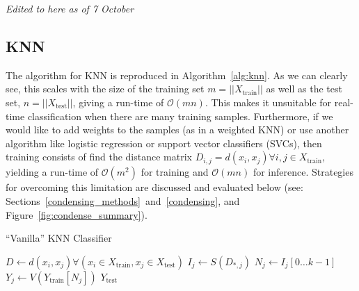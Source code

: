 \documentclass[conference]{IEEEtran}
\newcommand{\cm}[1]{\textit{{\color{blue}#1}}}
\begin{document}
\cm{Edited to here as of 7 October}
\subsection{KNN}
\label{runtime}
The algorithm for KNN is reproduced in Algorithm~\ref{alg:knn}. As we can clearly see, this scales with the size of the training set $m = || X_{\text{train}} || $ as well as the test set, $n = || X_{\text{test}} ||$, giving a run-time of $\mathcal{O}(mn)$.
This makes it unsuitable for real-time classification when there are many training samples. 
Furthermore, if we would like to add weights to the samples (as in a weighted KNN) or use another algorithm like logistic regression or support vector classifiers (SVCs), then training consists of find the distance matrix $D_{i,j} = d(x_i, x_j) \forall i,j \in X_{\text{train}}$, yielding a run-time of $\mathcal{O}(m^2)$ for training and $\mathcal{O}(mn)$ for inference. Strategies for overcoming this limitation are discussed and evaluated below (see: Sections~\ref{condensing_methods}~and~\ref{condensing}, and Figure~\ref{fig:condense_summary}). 



\begin{algorithm}
\begin{algorithmic}
    \caption{``Vanilla'' KNN Classifier}
    \label{alg:knn}
    \label{alg:vanilla}
    \State $D \gets d(x_i,x_j) \forall \left( x_i \in X_{\text{train}}, x_j \in X_{\text{test}} \right)$  
       
        \State $I_j \gets S(D_{*,j})$ 
        \State $N_j \gets I_j[0 \ldots k-1]$ 
        \State $Y_j \gets V(Y_{\text{train}}[N_j])$ 
    \EndFor
    \State \Return $Y_{\text{test}}$
\end{algorithmic}
\end{algorithm}
\end{document}
